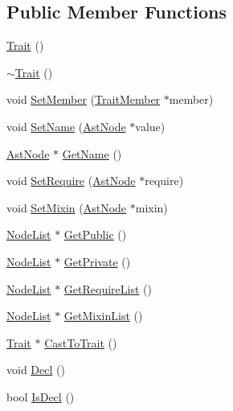 \subsection*{Public Member Functions}
\begin{DoxyCompactItemize}
\item 
\hyperlink{classmocha_1_1_trait_a9f4986830aaa74feae8e603db5101d77}{Trait} ()
\item 
\hyperlink{classmocha_1_1_trait_a079392cc5c4b368506ff809773a3e160}{$\sim$Trait} ()
\item 
void \hyperlink{classmocha_1_1_trait_aa9049f4a133113588dc542990453162f}{SetMember} (\hyperlink{classmocha_1_1_trait_member}{TraitMember} $\ast$member)
\item 
void \hyperlink{classmocha_1_1_trait_a34e04e7a8b964318d53452c22d147b83}{SetName} (\hyperlink{classmocha_1_1_ast_node}{AstNode} $\ast$value)
\item 
\hyperlink{classmocha_1_1_ast_node}{AstNode} $\ast$ \hyperlink{classmocha_1_1_trait_a3f1195124d7c88187bf3a22123f4dbd6}{GetName} ()
\item 
void \hyperlink{classmocha_1_1_trait_a1f66ad965394d3cac2f9429477f7d3cc}{SetRequire} (\hyperlink{classmocha_1_1_ast_node}{AstNode} $\ast$require)
\item 
void \hyperlink{classmocha_1_1_trait_a8a921a84ae07ae97a6c9af1454f96240}{SetMixin} (\hyperlink{classmocha_1_1_ast_node}{AstNode} $\ast$mixin)
\item 
\hyperlink{classmocha_1_1_node_list}{NodeList} $\ast$ \hyperlink{classmocha_1_1_trait_a54ef57cd1166d8bc7912e3961ad0ce1c}{GetPublic} ()
\item 
\hyperlink{classmocha_1_1_node_list}{NodeList} $\ast$ \hyperlink{classmocha_1_1_trait_a963c2c9fd0c2077d249b94f032e156fb}{GetPrivate} ()
\item 
\hyperlink{classmocha_1_1_node_list}{NodeList} $\ast$ \hyperlink{classmocha_1_1_trait_a55f5d696e623bf1b1124078539106409}{GetRequireList} ()
\item 
\hyperlink{classmocha_1_1_node_list}{NodeList} $\ast$ \hyperlink{classmocha_1_1_trait_abab3b437c5e0baa9bafcc075f9324bac}{GetMixinList} ()
\item 
\hyperlink{classmocha_1_1_trait}{Trait} $\ast$ \hyperlink{classmocha_1_1_trait_a7c28c44797d688ae7786f6c8e96a2e17}{CastToTrait} ()
\item 
void \hyperlink{classmocha_1_1_trait_aeefa80b383b7be34f0627d3f21b4fefd}{Decl} ()
\item 
bool \hyperlink{classmocha_1_1_trait_a33c183b34a3659aeb26fa11fbf08dc12}{IsDecl} ()
\end{DoxyCompactItemize}
